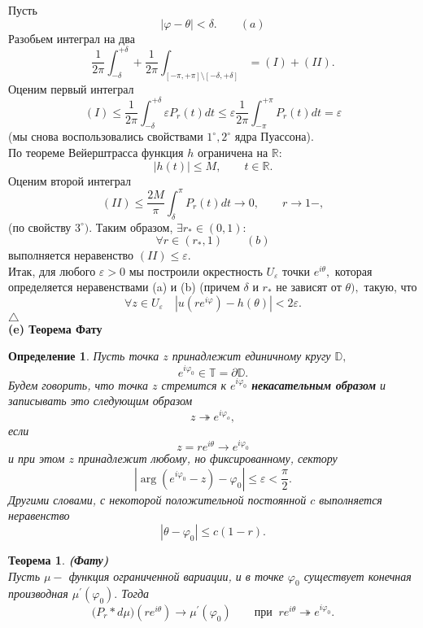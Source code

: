 \documentclass[12 pt, a4 paper]{article}
\theoremstyle{plain}   \newtheorem{Pro}{Задача}
\newtheorem{Def}{Определение}
\newtheorem{The}{Теорема}
\begin{document}
Пусть
$$
  |\varphi - \theta |< \delta . \qquad (a)
$$
Разобьем интеграл на два
$$
  \frac{1}{2\pi}\int _{-\delta}^{+\delta} +
  \frac{1}{2\pi} \int _{[-\pi , +\pi ] \setminus [-\delta ,+\delta ]}
  =(I) + (II).
$$
Оценим первый интеграл
$$
  (I) \leq \frac{1}{2\pi}\int _{-\delta }^{+\delta}
  \varepsilon P_r (t)dt \leq \varepsilon \frac{1}{2\pi}
  \int _{-\pi}^{+\pi}P_r (t)dt =\varepsilon
$$
(мы снова воспользовались свойствами
$ 1^{\circ}, 2^{\circ} $
ядра Пуассона).
\\
По теореме Вейерштрасса функция
$ h $
ограничена на
$ \mathbb{R} : $
$$
  |h(t)| \leq M, \qquad t \in \mathbb{R} .
$$
Оценим второй интеграл
$$
  (II) \leq \frac{2M}{\pi} \int _{\delta}^{\pi}
  P_r (t) dt \rightarrow 0 , \qquad r \rightarrow 1- ,
$$
(по свойству
$ 3^{\circ} ).$
Таким образом,
$ \exists r_{\ast} \in (0,1): $
$$
  \forall r \in (r_{\ast},1) \qquad (b)
$$
выполняется неравенство
$ (II) \leq \varepsilon . $
\\
Итак, для любого
$ \varepsilon >0 $
мы построили окрестность
$ U_{\varepsilon} $
точки
$ e^{i\theta} ,$
которая определяется неравенствами (a) и (b) (причем
$ \delta $ и $ r_{\ast} $
не зависят от
$ \theta ), $
такую, что
$$
  \forall z \in U_{\varepsilon} \quad
  |u(re^{i\varphi})-h(\theta )|<2\varepsilon .
$$
$ \triangle $
\\
{\bfseries (e) Теорема Фату}
\begin{Def}
Пусть точка
$ z $
принадлежит единичному кругу
$ \mathbb{D} , $
$$
  e^{i\varphi _0} \in \mathbb{T} =
  \partial \mathbb{D} .
$$
Будем говорить, что точка
$ z $
стремится к
$ e^{i\varphi _0} $
{\bfseries некасательным образом}
и записывать это следующим образом
$$
  z \twoheadrightarrow e^{i\varphi _o},
$$
если
$$
  z=re^{i\theta} \longrightarrow e^{i\varphi _0}
$$
и при этом
$ z $
принадлежит любому, но фиксированному, сектору
$$
  |\arg (e^{i\varphi _0}-z)-\varphi _0 | \leq \varepsilon <
  \frac{\pi}{2}.
$$
Другими словами, с некоторой положительной постоянной
$ c $
выполняется неравенство
$$
  |\theta - \varphi _0 | \leq c(1-r).
$$
\end{Def}
\begin{The}
{\bfseries (Фату)}
\\
Пусть
$ \mu - $
функция ограниченной вариации, и в точке
$ \varphi _0 $
существует конечная производная
$ \mu ^{\prime}(\varphi _0 ). $
Тогда
$$
  \biggl ( P_r \ast d\mu \biggr )
  (r e^{i\theta}) \longrightarrow
  \mu ^{\prime}(\varphi _0 )
  \qquad при \; \; re^{i\theta}
  \twoheadrightarrow e^{i\varphi _0}.
$$
\end{The}
\end{document}
